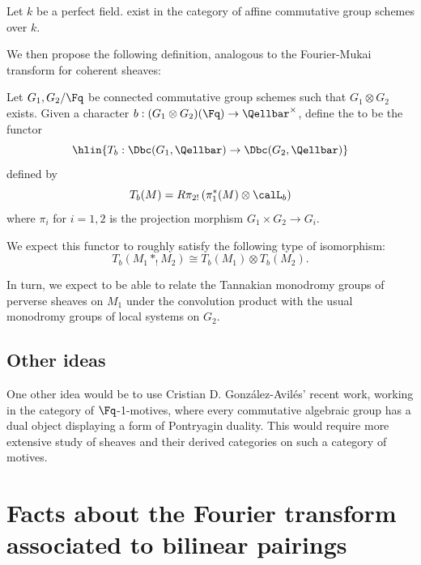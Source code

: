\begin{theorem}
    Let $k$ be a perfect field.  exist in the category of affine commutative group schemes over $k$.
\end{theorem}



We then propose the following definition, analogous to the Fourier-Mukai transform for coherent sheaves:

\begin{definition} \label{definition:fourier_transform_functor_for_a_bilinear_pairing_of_commutative_group_schemes_over_a_field}
    Let $G_1,G_2/\Fq$ be connected commutative group schemes such that $G_1 \otimes G_2$ exists. Given a character $b: (G_1 \otimes G_2)(\Fq) \to \Qellbar^\times$, define the  to be the functor
    $$\hlin{T_{b}: \Dbc(G_1, \Qellbar) \to \Dbc(G_2, \Qellbar)}$$
    defined by
    $$T_b(M) = R\pi_{2!}\left( \pi_1^*(M) \otimes \calL_b \right)$$
    where $\pi_i$ for $i = 1,2$ is the projection morphism $G_1 \times G_2 \to G_i$.
\end{definition}

We expect this functor to roughly satisfy the following type of isomorphism:
$$T_b(M_1 *_! M_2) \cong T_b(M_1) \otimes T_b(M_2).$$

In turn, we expect to be able to relate the Tannakian monodromy groups of perverse sheaves on $M_1$ under the convolution product with the usual monodromy groups of local systems on $G_2$.

\subsection{Other ideas}
One other idea would be to use Cristian D. Gonz\'alez-Avil\'es' recent work, working in the category of $\Fq$-1-motives, where every commutative algebraic group has a dual object displaying a form of Pontryagin duality. This would require more extensive study of sheaves and their derived categories on such a category of motives.

\section{Facts about the Fourier transform associated to bilinear pairings}

